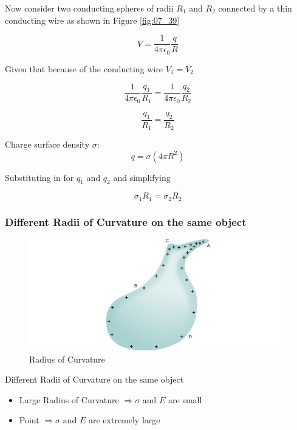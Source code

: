 \documentclass[14pt]{memoir}
\begin{document}
Now consider two conducting spheres of radii $R_1$ and $R_2$ connected by a thin conducting wire as shown in Figure \ref{fig:07_39}

\begin{equation}
V = \frac{1}{4 \pi \epsilon_0} \frac{q}{R}
\end{equation}

Given that because of the conducting wire $V_1 = V_2$

\begin{equation}
\frac{1}{4 \pi \epsilon_0} \frac{q_1}{R_1} = \frac{1}{4 \pi \epsilon_0} \frac{q_2}{R_2}
\end{equation}

\begin{equation}
\frac{q_1}{R_1} = \frac{q_2}{R_2}
\end{equation}

Charge surface density $\sigma$: 
\begin{equation}
q = \sigma(4 \pi R^2)
\end{equation}

Substituting in for $q_1$ and $q_2$ and simplifying

\begin{equation}
\sigma_1 R_1 = \sigma_2 R_2
\end{equation}

\subsubsection{Different Radii of Curvature on the same object}

\begin{figure}[H]
\begin{center}
\includegraphics[scale=0.50]{fig/fig_07_40.jpg}
\caption{Radius of Curvature}
\label{fig:07_40}
\end{center}
\end{figure}

Different Radii of Curvature on the same object
\begin{itemize}
\item Large Radius of Curvature $\Rightarrow \sigma \text{ and } E$ are small
\item Point $\Rightarrow \sigma \text{ and } E$ are extremely large
\end{itemize}
\end{document}
